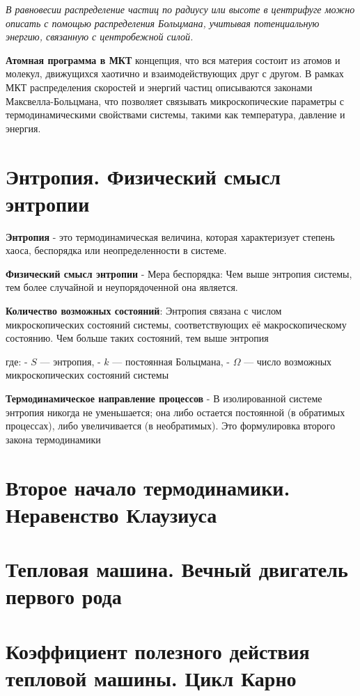 \documentclass[14pt]{article}
\begin{document}
\textit{В равновесии распределение частиц по радиусу или высоте в центрифуге можно описать с помощью распределения Больцмана, учитывая потенциальную энергию, связанную с центробежной силой.}

\textbf{Атомная программа в МКТ}
\newline концепция, что вся материя состоит из атомов и молекул, движущихся хаотично и взаимодействующих друг с другом. В рамках МКТ распределения скоростей и энергий частиц описываются законами Максвелла-Больцмана, что позволяет связывать микроскопические параметры с термодинамическими свойствами системы, такими как температура, давление и энергия.



\section{Энтропия. Физический смысл энтропии}
\textbf{Энтропия} - это термодинамическая величина, которая характеризует степень хаоса, беспорядка или неопределенности в системе.

\textbf{Физический смысл энтропии} - Мера беспорядка: Чем выше энтропия системы, тем более случайной и неупорядоченной она является.

\textbf{Количество возможных состояний}: Энтропия связана с числом микроскопических состояний системы, соответствующих её макроскопическому состоянию. Чем больше таких состояний, тем выше энтропия
\begin{center}
    \big[\[ S = k \ln \Omega \]\big]
    \newline где: - \(S\) — энтропия, - \(k\) — постоянная Больцмана, - \(\Omega\) — число возможных микроскопических состояний системы
\end{center}
\textbf{Термодинамическое направление процессов} -  В изолированной системе энтропия никогда не уменьшается; она либо остается постоянной (в обратимых процессах), либо увеличивается (в необратимых). Это формулировка второго закона термодинамики



\section{Второе начало термодинамики. Неравенство Клаузиуса}





\section{Тепловая машина. Вечный двигатель первого рода}

\section{Коэффициент полезного действия тепловой машины. Цикл Карно}
    
\end{document}
